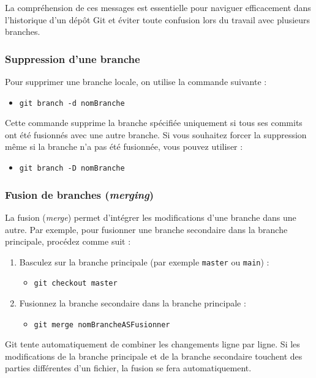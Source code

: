 \documentclass{article}
\begin{document}
La compréhension de ces messages est essentielle pour naviguer efficacement dans l’historique d’un dépôt Git et éviter toute confusion lors du travail avec plusieurs branches.
\subsubsection{Suppression d'une branche}

Pour supprimer une branche locale, on utilise la commande suivante :
\begin{itemize}
    \item \texttt{git branch -d nomBranche}
\end{itemize}
Cette commande supprime la branche spécifiée uniquement si tous ses commits ont été fusionnés avec une autre branche.  
Si vous souhaitez forcer la suppression même si la branche n’a pas été fusionnée, vous pouvez utiliser :
\begin{itemize}
    \item \texttt{git branch -D nomBranche}
\end{itemize}

\subsubsection{Fusion de branches (\emph{merging})}

La fusion (\emph{merge}) permet d’intégrer les modifications d’une branche dans une autre. Par exemple, pour fusionner une branche secondaire dans la branche principale, procédez comme suit :

\begin{enumerate}
    \item Basculez sur la branche principale (par exemple \texttt{master} ou \texttt{main}) :
    \begin{itemize}
        \item \texttt{git checkout master}
    \end{itemize}
    \item Fusionnez la branche secondaire dans la branche principale :
    \begin{itemize}
        \item \texttt{git merge nomBrancheASFusionner}
    \end{itemize}
\end{enumerate}

Git tente automatiquement de combiner les changements ligne par ligne. Si les modifications de la branche principale et de la branche secondaire touchent des parties différentes d’un fichier, la fusion se fera automatiquement.
\end{document}

